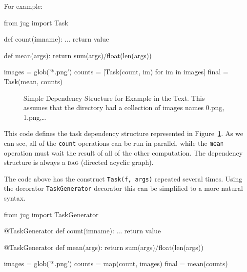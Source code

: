 \documentclass{article}
\let\code\texttt
\begin{document}
For example:

\begin{python}
from jug import Task

def count(imname):
    ...
    return value

def mean(args):
    return sum(args)/float(len(args))

images = glob('*.png')
counts = [Task(count, im) for im in images]
final = Task(mean, counts)
\end{python}

\begin{figure}
\begin{center}

\end{center}
\caption{Simple Dependency Structure for Example in the Text. This assumes that
the directory had a collection of images names 0.png, 1.png,\ldots}
\label{fig:jug-deps}
\end{figure}

This code defines the task dependency structure represented in
Figure~\ref{fig:jug-deps}. As we can see, all of the \code{count} operations
can be run in parallel, while the \code{mean} operation must wait the result of
all of the other computation. The dependency structure is always a \textsc{dag}
(directed acyclic graph).

The code above has the construct \code{Task(f, args)} repeated several times.
Using the decorator \code{TaskGenerator} decorator this can be simplified to a
more natural syntax.

\begin{python}
from jug import TaskGenerator

@TaskGenerator
def count(imname):
    ...
    return value

@TaskGenerator
def mean(args):
    return sum(args)/float(len(args))

images = glob('*.png')
counts = map(count, images)
final = mean(counts)
\end{python}
\end{document}
